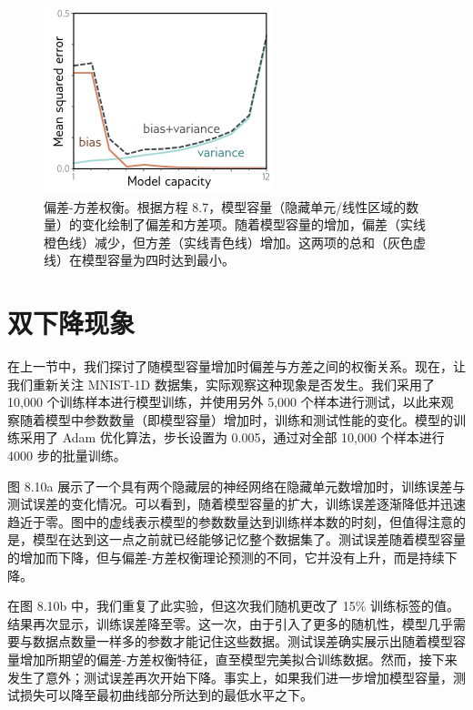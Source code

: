 \begin{figure}[ht!]
\centering
\includegraphics[width=0.7\linewidth]{png/chapter8/PerfBiasVarianceTradeoff.png}
\caption{偏差-方差权衡。根据方程 8.7，模型容量（隐藏单元/线性区域的数量）的变化绘制了偏差和方差项。随着模型容量的增加，偏差（实线橙色线）减少，但方差（实线青色线）增加。这两项的总和（灰色虚线）在模型容量为四时达到最小。}
\end{figure}

\section{双下降现象}
在上一节中，我们探讨了随模型容量增加时偏差与方差之间的权衡关系。现在，让我们重新关注 MNIST-1D 数据集，实际观察这种现象是否发生。我们采用了 10,000 个训练样本进行模型训练，并使用另外 5,000 个样本进行测试，以此来观察随着模型中参数数量（即模型容量）增加时，训练和测试性能的变化。模型的训练采用了 Adam 优化算法，步长设置为 0.005，通过对全部 10,000 个样本进行 4000 步的批量训练。

图 8.10a 展示了一个具有两个隐藏层的神经网络在隐藏单元数增加时，训练误差与测试误差的变化情况。可以看到，随着模型容量的扩大，训练误差逐渐降低并迅速趋近于零。图中的虚线表示模型的参数数量达到训练样本数的时刻，但值得注意的是，模型在达到这一点之前就已经能够记忆整个数据集了。测试误差随着模型容量的增加而下降，但与偏差-方差权衡理论预测的不同，它并没有上升，而是持续下降。

在图 8.10b 中，我们重复了此实验，但这次我们随机更改了 15\% 训练标签的值。结果再次显示，训练误差降至零。这一次，由于引入了更多的随机性，模型几乎需要与数据点数量一样多的参数才能记住这些数据。测试误差确实展示出随着模型容量增加所期望的偏差-方差权衡特征，直至模型完美拟合训练数据。然而，接下来发生了意外；测试误差再次开始下降。事实上，如果我们进一步增加模型容量，测试损失可以降至最初曲线部分所达到的最低水平之下。

